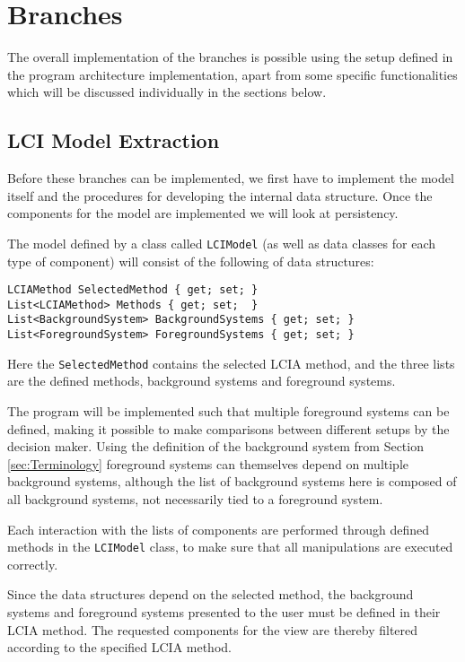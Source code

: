 \section{Branches} \label{sec:Implementation-Branches}
The overall implementation of the branches is possible using the setup defined in the program architecture implementation, apart from some specific functionalities which will be discussed individually in the sections below.

\subsection{LCI Model Extraction} \label{ssec:Implementation-LCIModelExtraction}
Before these branches can be implemented, we first have to implement the model itself and the procedures for developing the internal data structure. Once the components for the model are implemented we will look at persistency. 

The model defined by a class called \texttt{LCIModel} (as well as data classes for each type of component) will consist of the following of data structures:

\begin{lstlisting}[language=CSharp]
LCIAMethod SelectedMethod { get; set; }
List<LCIAMethod> Methods { get; set;  }
List<BackgroundSystem> BackgroundSystems { get; set; }
List<ForegroundSystem> ForegroundSystems { get; set; }
\end{lstlisting}

Here the \texttt{SelectedMethod} contains the selected LCIA method, and the three lists are the defined methods, background systems and foreground systems.

The program will be implemented such that multiple foreground systems can be defined, making it possible to make comparisons between different setups by the decision maker. Using the definition of the background system from Section \ref{sec:Terminology} foreground systems can themselves depend on multiple background systems, although the list of background systems here is composed of all background systems, not necessarily tied to a foreground system.

Each interaction with the lists of components are performed through defined methods in the \texttt{LCIModel} class, to make sure that all manipulations are executed correctly. 

Since the data structures depend on the selected method, the background systems and foreground systems presented to the user must be defined in their LCIA method. The requested components for the view are thereby filtered according to the specified LCIA method.

